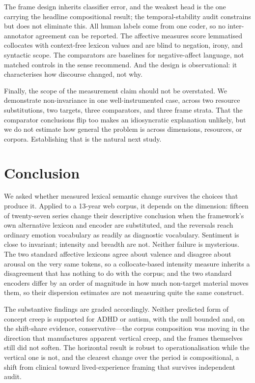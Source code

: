 \documentclass[final]{clv2025}
\begin{document}
The frame design inherits classifier error, and the weakest head is the one carrying the
headline compositional result; the temporal-stability audit constrains but does not
eliminate this. All human labels come from one coder, so no inter-annotator agreement can
be reported. The affective measures score lemmatised collocates with
context-free lexicon values and are blind to negation, irony, and syntactic scope. The
comparators are baselines for negative-affect language, not matched controls in the sense
\citet{dubossarsky-etal-2017-outta} recommend. And the design is observational: it
characterises how discourse changed, not why.

Finally, the scope of the measurement claim should not be overstated. We demonstrate
non-invariance in one well-instrumented case, across two resource substitutions, two
targets, three comparators, and three frame strata. That the comparator conclusions flip
too makes an idiosyncratic explanation unlikely, but we do not estimate how general the
problem is across dimensions, resources, or corpora. Establishing that is the natural next
study.

\section{Conclusion}

We asked whether measured lexical semantic change survives the choices that produce it.
Applied to a 13-year web corpus, it depends on the dimension: fifteen of twenty-seven series
change their descriptive conclusion when the framework's own alternative lexicon and encoder
are substituted, and the reversals reach ordinary emotion vocabulary as readily as diagnostic
vocabulary. Sentiment is close to invariant; intensity and breadth are not. Neither failure
is mysterious. The two standard affective lexicons agree about valence and disagree about
arousal on the very same tokens, so a collocate-based intensity measure inherits a
disagreement that has nothing to do with the corpus; and the two standard encoders differ by
an order of magnitude in how much non-target material moves them, so their dispersion
estimates are not measuring quite the same construct.

The substantive findings are graded accordingly. Neither predicted form of concept creep is
supported for ADHD or autism, with the null bounded and, on the shift-share evidence,
conservative---the corpus composition was moving in the direction that manufactures apparent
vertical creep, and the frames themselves still did not soften. The horizontal result is
robust to operationalisation while the vertical one is not, and the clearest change over the
period is compositional, a shift from clinical toward lived-experience framing that survives
independent audit.
\end{document}

